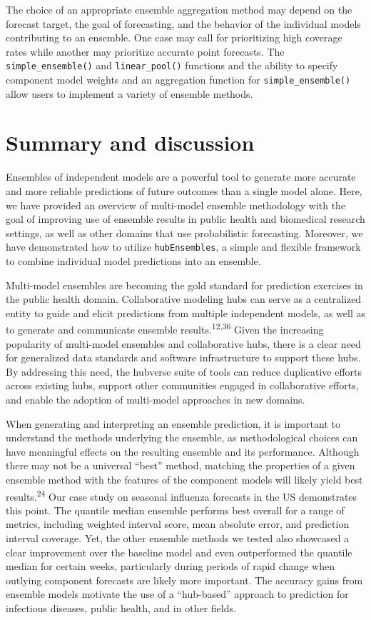 \documentclass[
]{article}
\begin{document}
The choice of an appropriate ensemble aggregation method may depend on
the forecast target, the goal of forecasting, and the behavior of the
individual models contributing to an ensemble. One case may call for
prioritizing high coverage rates while another may prioritize accurate
point forecasts. The \texttt{simple\_ensemble()} and
\texttt{linear\_pool()} functions and the ability to specify component
model weights and an aggregation function for
\texttt{simple\_ensemble()} allow users to implement a variety of
ensemble methods.

\section{Summary and discussion}\label{sec-conclusions}

Ensembles of independent models are a powerful tool to generate more
accurate and more reliable predictions of future outcomes than a single
model alone. Here, we have provided an overview of multi-model ensemble
methodology with the goal of improving use of ensemble results in public
health and biomedical research settings, as well as other domains that
use probabilistic forecasting. Moreover, we have demonstrated how to
utilize \texttt{hubEnsembles}, a simple and flexible framework to
combine individual model predictions into an ensemble.

Multi-model ensembles are becoming the gold standard for prediction
exercises in the public health domain. Collaborative modeling hubs can
serve as a centralized entity to guide and elicit predictions from
multiple independent models, as well as to generate and communicate
ensemble results.\textsuperscript{12,36} Given the increasing popularity
of multi-model ensembles and collaborative hubs, there is a clear need
for generalized data standards and software infrastructure to support
these hubs. By addressing this need, the hubverse suite of tools can
reduce duplicative efforts across existing hubs, support other
communities engaged in collaborative efforts, and enable the adoption of
multi-model approaches in new domains.

When generating and interpreting an ensemble prediction, it is important
to understand the methods underlying the ensemble, as methodological
choices can have meaningful effects on the resulting ensemble and its
performance. Although there may not be a universal ``best'' method,
matching the properties of a given ensemble method with the features of
the component models will likely yield best results.\textsuperscript{24}
Our case study on seasonal influenza forecasts in the US demonstrates
this point. The quantile median ensemble performs best overall for a
range of metrics, including weighted interval score, mean absolute
error, and prediction interval coverage. Yet, the other ensemble methods
we tested also showcased a clear improvement over the baseline model and
even outperformed the quantile median for certain weeks, particularly
during periods of rapid change when outlying component forecasts are
likely more important. The accuracy gains from ensemble models motivate
the use of a ``hub-based'' approach to prediction for infectious
diseases, public health, and in other fields.
\end{document}
